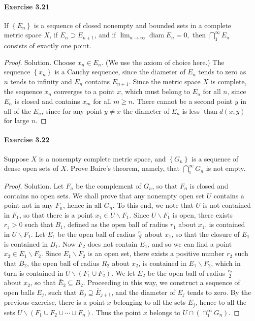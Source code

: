 \documentclass{article}
\theoremstyle{definition}
\begin{document}
\paragraph{Exercise 3.21} If $\left\{E_{n}\right\}$ is a sequence of closed nonempty and bounded sets in a complete metric space $X$, if $E_{n} \supset E_{n+1}$, and if $\lim _{n \rightarrow \infty} \operatorname{diam} E_{n}=0,$ then $\bigcap_{1}^{\infty} E_{n}$ consists of exactly one point.
\begin{proof}
    Solution. Choose $x_n \in E_n$. (We use the axiom of choice here.) The sequence $\left\{x_n\right\}$ is a Cauchy sequence, since the diameter of $E_n$ tends to zero as $n$ tends to infinity and $E_n$ contains $E_{n+1}$. Since the metric space $X$ is complete, the sequence $x_n$ converges to a point $x$, which must belong to $E_n$ for all $n$, since $E_n$ is closed and contains $x_m$ for all $m \geq n$. There cannot be a second point $y$ in all of the $E_n$, since for any point $y \neq x$ the diameter of $E_n$ is less $\operatorname{than} d(x, y)$ for large $n$.
\end{proof}


\paragraph{Exercise 3.22} Suppose $X$ is a nonempty complete metric space, and $\left\{G_{n}\right\}$ is a sequence of dense open sets of $X$. Prove Baire's theorem, namely, that $\bigcap_{1}^{\infty} G_{n}$ is not empty.
\begin{proof}
    Solution. Let $F_n$ be the complement of $G_n$, so that $F_n$ is closed and contains no open sets. We shall prove that any nonempty open set $U$ contains a point not in any $F_n$, hence in all $G_n$. To this end, we note that $U$ is not contained in $F_1$, so that there is a point $x_1 \in U \backslash F_1$. Since $U \backslash F_1$ is open, there exists $r_1>0$ such that $B_1$, defined as the open ball of radius $r_1$ about $x_1$, is contained in $U \backslash F_1$. Let $E_1$ be the open ball of radius $\frac{r_1}{2}$ about $x_1$, so that the closure of $E_1$ is contained in $B_1$. Now $F_2$ does not contain $E_1$, and so we can find a point $x_2 \in E_1 \backslash F_2$. Since $E_1 \backslash F_2$ is an open set, there exists a positive number $r_2$ such that $B_2$, the open ball of radius $R_2$ about $x_2$, is contained in $E_1 \backslash F_2$, which in turn is contained in $U \backslash\left(F_1 \cup F_2\right)$. We let $E_2$ be the open ball of radius $\frac{r_2}{2}$ about $x_2$, so that $\bar{E}_2 \subseteq B_2$. Proceeding in this way, we construct a sequence of open balls $E_j$, such that $E_j \supseteq \bar{E}_{j+1}$, and the diameter of $E_j$ tends to zero. By the previous exercise, there is a point $x$ belonging to all the sets $\bar{E}_j$, hence to all the sets $U \backslash\left(F_1 \cup F_2 \cup \cdots \cup F_n\right)$. Thus the point $x$ belongs to $U \cap\left(\cap_1^{\infty} G_n\right)$.
\end{proof}
\end{document}
